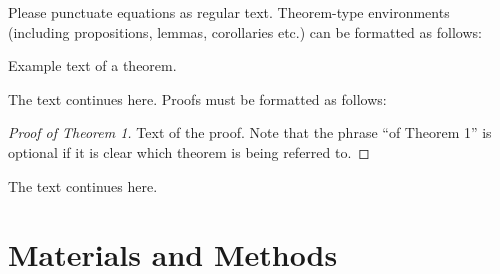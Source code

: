 
Please punctuate equations as regular text. Theorem-type environments (including propositions, lemmas, corollaries etc.) can be formatted as follows:
\begin{Theorem}
Example text of a theorem.
\end{Theorem}

The text continues here. Proofs must be formatted as follows:

\begin{proof}[Proof of Theorem 1]
Text of the proof. Note that the phrase ``of Theorem 1'' is optional if it is clear which theorem is being referred to.
\end{proof}
The text continues here.





\section{Materials and Methods}

